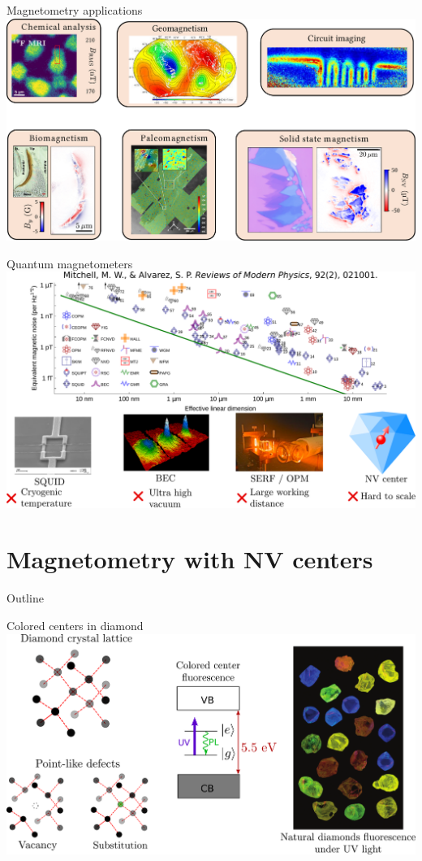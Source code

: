 \documentclass{beamer}
\begin{document}
\begin{frame}{Magnetometry applications}
\centering
\includegraphics[width=\textwidth,height=0.9\textheight,keepaspectratio]{Slide_example_magnetometry}
\end{frame}

\begin{frame}{Quantum magnetometers}
\centering
\includegraphics[width=\textwidth,height=0.9\textheight,keepaspectratio]{Slide_quantum_magnetometers}
\end{frame}

\section{Magnetometry with NV centers}
\begin{frame}{Outline}
\tableofcontents[currentsection]
\end{frame}

\begin{frame}{Colored centers in diamond}
\centering
\includegraphics[width=\textwidth,height=0.9\textheight,keepaspectratio]{Slide diamant}
\end{frame}
\end{document}
